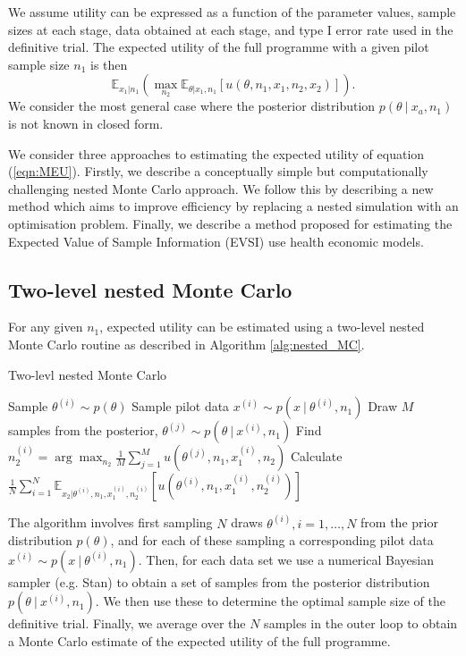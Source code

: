 \documentclass[sagev, Crown]{sagej} %
\begin{document}
We assume utility can be expressed as a function of the parameter values, sample sizes at each stage, data obtained at each stage, and type I error rate used in the definitive trial. The expected utility of the full programme with a given pilot sample size $n_1$ is then
\begin{equation}\label{eqn:MEU}
\mathbb{E}_{x_1 | n_1} \left( \max_{n_2} \mathbb{E}_{\theta | x_1, n_1}[u(\theta, n_1, x_1, n_2, x_2)] \right).
\end{equation}
We consider the most general case where the posterior distribution $p(\theta ~|~ x_a, n_1)$ is not known in closed form.

We consider three approaches to estimating the expected utility of equation (\ref{eqn:MEU}). Firstly, we describe a conceptually simple but computationally challenging nested Monte Carlo approach. We follow this by describing a new method which aims to improve efficiency by replacing a nested simulation with an optimisation problem. Finally, we describe a method proposed for estimating the Expected Value of Sample Information (EVSI) use health economic models.

\subsection{Two-level nested Monte Carlo}\label{sec:nested_MC}

For any given $n_1$, expected utility can be estimated using a two-level nested Monte Carlo routine as described in Algorithm \ref{alg:nested_MC}. 

\begin{algorithm}
\caption{Two-levl nested Monte Carlo}\label{alg:nested_MC}
\begin{algorithmic}[1]
\State Sample $\theta^{(i)} \sim p(\theta)$
\State Sample pilot data $x^{(i)} \sim p(x ~|~ \theta^{(i)}, n_1)$
\State Draw $M$ samples from the posterior, $\theta^{(j)} \sim p(\theta ~|~ x^{(i)}, n_1)$
\State Find  $n_2^{(i)} = \arg\max_{n_2} \frac{1}{M} \sum_{j=1}^{M} u(\theta^{(j)}, n_1, x_1^{(i)}, n_2)$
\EndFor 
\State Calculate $\frac{1}{N} \sum_{i=1}^{N} \mathbb{E}_{x_2 | \theta^{(i)}, n_1, x_1^{(i)}, n_2^{(i)}}[ u(\theta^{(i)}, n_1, x_1^{(i)}, n_2^{(i)}) ]$
\end{algorithmic}
\end{algorithm}

The algorithm involves first sampling $N$ draws $\theta^{(i)}, i=1,\ldots,N$ from the prior distribution $p(\theta)$, and for each of these sampling a corresponding pilot data $x^{(i)} \sim p(x ~|~ \theta^{(i)}, n_1)$. Then, for each data set we use a numerical Bayesian sampler (e.g. Stan) to obtain a set of samples from the posterior distribution $p(\theta ~|~ x^{(i)}, n_1)$. We then use these to determine the optimal sample size of the definitive trial. Finally, we average over the $N$ samples in the outer loop to obtain a Monte Carlo estimate of the expected utility of the full programme.
\end{document}

